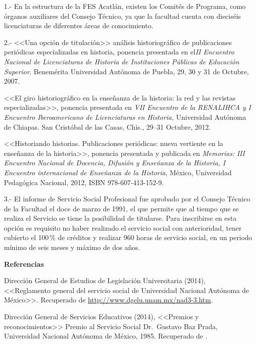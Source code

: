 \begin{Obs}
\item[1.-] En la estructura de la FES Acatlán, existen los Comités de
Programa, como órganos auxiliares del Consejo Técnico, ya que la facultad
cuenta con dieciséis licenciaturas de diferentes áreas de
conocimiento.
\item[2.-]  <<Una opción de titulación>> análisis historiográfico de
publicaciones periódicas especializadas en historia, ponencia presentada en
el\linebreak \textit{II Encuentro Nacional de Licenciaturas de Historia de
Instituciones Públicas de Educación Superior}. Benemérita Universidad
Autónoma de Puebla, 29, 30 y 31 de Octubre, 2007.
\newpage

<<El giro historiográfico en la enseñanza de la historia: la red y las
revistas especializadas>>, ponencia presentada en \textit{VII
Encuentro de la RENALIHCA y I Encuentro Iberoamericano de Licenciaturas en
Historia,} Universidad Autónoma de Chiapas. San Cristóbal de las
Casas, Chis., 29--31 Octubre, 2012.


<<Historiando historias. Publicaciones periódicas: nueva vertiente
en la enseñanza de la historia>>, ponencia presentada y publicada en
\textit{Memorias: }\textit{III Encuentro Nacional de Docencia, Difusión y
Enseñanza de la Historia, I Encuentro internacional de Enseñanza de la
Historia}, México, Universidad Pedagógica Nacional, 2012, ISBN
978-607-413-152-9.
\item[3.-]  El informe de Servicio Social Profesional fue aprobado  por el
Consejo Técnico de la Facultad el doce de marzo de 1991, el que permite que
al tiempo que se realiza el Servicio se tiene la posibilidad de titularse.
Para inscribirse en esta opción es requisito no haber realizado el servicio
social con anterioridad, tener cubierto el 100\,\% de créditos y realizar 960
horas de servicio social,  en un periodo mínimo de seis meses y máximo de
dos años.
\end{Obs}
\newpage

\textbf{Referencias} 


\medskip
\begin{sloppypar}
Dirección General de Estudios de Legislación Universitaria (2014),
<<Reglamento general del servicio social de Universidad Nacional Autónoma de
México>>. Recuperado de \url{http://www.dgelu.unam.mx/nad3-3.htm}.  
\end{sloppypar}

\begin{sloppypar}
Dirección General de Servicios Educativos (2014), <<Premios y
reconocimientos>> Premio al Servicio Social Dr.\ Gustavo Baz Prada,
Universidad Nacional Autónoma de México, 1985. Recuperado de
\href{http://www.dgose.unam.mx/dgose/pregbp.html}{}.
\end{sloppypar}


